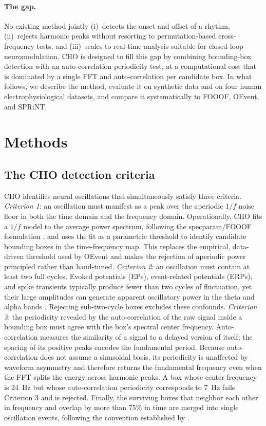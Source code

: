 \documentclass[11pt]{article}
\begin{document}
\paragraph{The gap.} No existing method jointly (i)~detects the onset and offset of a rhythm, (ii)~rejects harmonic peaks without resorting to permutation-based cross-frequency tests, and (iii)~scales to real-time analysis suitable for closed-loop neuromodulation. CHO is designed to fill this gap by combining bounding-box detection with an auto-correlation periodicity test, at a computational cost that is dominated by a single FFT and auto-correlation per candidate box. In what follows, we describe the method, evaluate it on synthetic data and on four human electrophysiological datasets, and compare it systematically to FOOOF, OEvent, and SPRiNT.

\section{Methods}

\subsection{The CHO detection criteria}

CHO identifies neural oscillations that simultaneously satisfy three criteria. \emph{Criterion 1}: an oscillation must manifest as a peak over the aperiodic $1/f$ noise floor in both the time domain and the frequency domain. Operationally, CHO fits a $1/f$ model to the average power spectrum, following the specparam/FOOOF formulation \citep{donoghue2020parameterizing}, and uses the fit as a parametric threshold to identify candidate bounding boxes in the time-frequency map. This replaces the empirical, data-driven threshold used by OEvent \citep{neymotin2022oevent} and makes the rejection of aperiodic power principled rather than hand-tuned. \emph{Criterion 2}: an oscillation must contain at least two full cycles. Evoked potentials (EPs), event-related potentials (ERPs), and spike transients typically produce fewer than two cycles of fluctuation, yet their large amplitudes can generate apparent oscillatory power in the theta and alpha bands \citep{decheveigne2019filters,donoghue2020parameterizing}. Rejecting sub-two-cycle boxes excludes these confounds. \emph{Criterion 3}: the periodicity revealed by the auto-correlation of the raw signal inside a bounding box must agree with the box's spectral center frequency. Auto-correlation measures the similarity of a signal to a delayed version of itself; the spacing of its positive peaks encodes the fundamental period. Because auto-correlation does not assume a sinusoidal basis, its periodicity is unaffected by waveform asymmetry and therefore returns the fundamental frequency even when the FFT splits the energy across harmonic peaks. A box whose center frequency is 24~Hz but whose auto-correlation periodicity corresponds to 7~Hz fails Criterion 3 and is rejected. Finally, the surviving boxes that neighbor each other in frequency and overlap by more than 75\% in time are merged into single oscillation events, following the convention established by \citet{neymotin2022oevent}.
\end{document}
